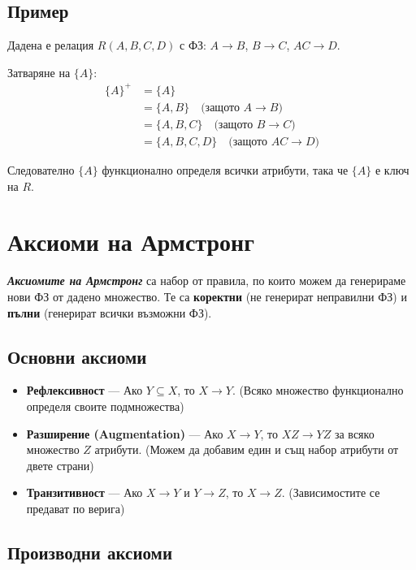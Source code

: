 \documentclass{scrartcl}
\begin{document}
\begin{FlushLeft}
\subsection{Пример}

Дадена е релация $R(A, B, C, D)$ с ФЗ: $A \rightarrow B$, $B \rightarrow C$, $AC \rightarrow D$.

Затваряне на $\{A\}$:
\begin{align*}
\{A\}^+ &= \{A\} \\
&= \{A, B\} \quad \text{(защото } A \rightarrow B \text{)} \\
&= \{A, B, C\} \quad \text{(защото } B \rightarrow C \text{)} \\
&= \{A, B, C, D\} \quad \text{(защото } AC \rightarrow D \text{)}
\end{align*}

Следователно $\{A\}$ функционално определя всички атрибути, така че $\{A\}$ е ключ на $R$.

\section{Аксиоми на Армстронг}

\textbf{\textit{Аксиомите на Армстронг}} са набор от правила, по които можем да генерираме нови ФЗ от дадено множество. Те са \textbf{коректни} (не генерират неправилни ФЗ) и \textbf{пълни} (генерират всички възможни ФЗ).

\subsection{Основни аксиоми}

\begin{itemize}
    \item \textbf{Рефлексивност} --- Ако $Y \subseteq X$, то $X \rightarrow Y$. (Всяко множество функционално определя своите подмножества)
    
    \item \textbf{Разширение (Augmentation)} --- Ако $X \rightarrow Y$, то $XZ \rightarrow YZ$ за всяко множество $Z$ атрибути. (Можем да добавим един и същ набор атрибути от двете страни)
    
    \item \textbf{Транзитивност} --- Ако $X \rightarrow Y$ и $Y \rightarrow Z$, то $X \rightarrow Z$. (Зависимостите се предават по верига)
\end{itemize}

\subsection{Производни аксиоми}


\end{FlushLeft}
\end{document}

